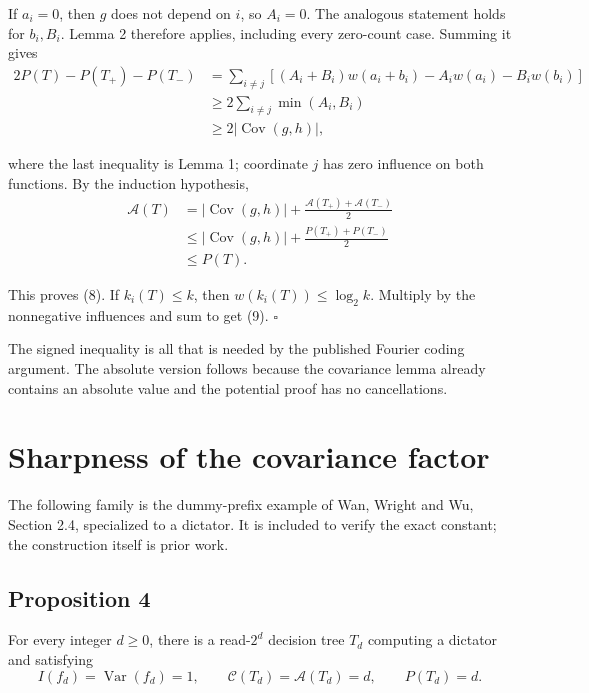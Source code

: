 \documentclass[
  american,
  11pt,
]{article}
\begin{document}
If \(a_i=0\), then \(g\) does not depend on \(i\), so \(A_i=0\). The
analogous statement holds for \(b_i,B_i\). Lemma 2 therefore applies,
including every zero-count case. Summing it gives \[
\begin{aligned}
2P(T)-P(T_+)-P(T_-)
&=\sum_{i\ne j}\left[(A_i+B_i)w(a_i+b_i)-A_iw(a_i)-B_iw(b_i)\right]\\
&\geq2\sum_{i\ne j}\min(A_i,B_i)\\
&\geq2|\operatorname{Cov}(g,h)|,
\end{aligned}
\tag{11}
\]

where the last inequality is Lemma 1; coordinate \(j\) has zero
influence on both functions. By the induction hypothesis, \[
\begin{aligned}
\mathcal A(T)
&=|\operatorname{Cov}(g,h)|+\frac{\mathcal A(T_+)+\mathcal A(T_-)}2\\
&\leq|\operatorname{Cov}(g,h)|+\frac{P(T_+)+P(T_-)}2\\
&\leq P(T).
\end{aligned}
\]

This proves (8). If \(k_i(T)\leq k\), then \(w(k_i(T))\leq\log_2k\).
Multiply by the nonnegative influences and sum to get (9). \(\square\)

The signed inequality is all that is needed by the published Fourier
coding argument. The absolute version follows because the covariance
lemma already contains an absolute value and the potential proof has no
cancellations.

\section{Sharpness of the covariance
factor}\label{sharpness-of-the-covariance-factor}

The following family is the dummy-prefix example of Wan, Wright and Wu,
Section 2.4, specialized to a dictator. It is included to verify the
exact constant; the construction itself is prior work.

\subsection*{Proposition 4}\label{proposition-4}

For every integer \(d\geq0\), there is a read-\(2^d\) decision tree
\(T_d\) computing a dictator and satisfying \[
I(f_d)=\operatorname{Var}(f_d)=1,\qquad
\mathcal C(T_d)=\mathcal A(T_d)=d,\qquad
P(T_d)=d.
\tag{12}
\]
\end{document}
